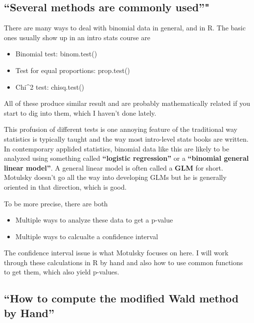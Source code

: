 \documentclass[]{book}
\providecommand{\tightlist}{%
  \setlength{\itemsep}{0pt}\setlength{\parskip}{0pt}}
\theoremstyle{definition}
\theoremstyle{definition}
\theoremstyle{definition}
\theoremstyle{remark}
\begin{document}
\subsection{\texorpdfstring{``Several methods are commonly
used''"}{Several methods are commonly used"}}\label{several-methods-are-commonly-used}

There are many ways to deal with binomial data in general, and in R. The
basic ones usually show up in an intro stats course are

\begin{itemize}
\tightlist
\item
  Binomial test: binom.test()
\item
  Test for equal proportions: prop.test()
\item
  Chi\^{}2 test: chisq.test()
\end{itemize}

All of these produce similar result and are probably mathematically
related if you start to dig into them, which I haven't done lately.

This profusion of different tests is one annoying feature of the
traditional way statistics is typically taught and the way most
intro-level stats books are written. In contemporary applided
statistics, binomial data like this are likely to be analyzed using
something called \textbf{``logistic regression''} or a
\textbf{``binomial general linear model''}. A general linear model is
often called a \textbf{GLM} for short. Motulsky doesn't go all the way
into developing GLMs but he is generally oriented in that direction,
which is good.

To be more precise, there are both

\begin{itemize}
\tightlist
\item
  Multiple ways to analyze these data to get a p-value
\item
  Multiple ways to calcualte a confidence interval
\end{itemize}

The confidence interval issue is what Motulsky focuses on here. I will
work through these calculations in R by hand and also how to use common
functions to get them, which also yield p-values.

\subsection{\texorpdfstring{``How to compute the modified Wald method by
Hand''}{How to compute the modified Wald method by Hand}}\label{how-to-compute-the-modified-wald-method-by-hand}
\end{document}
